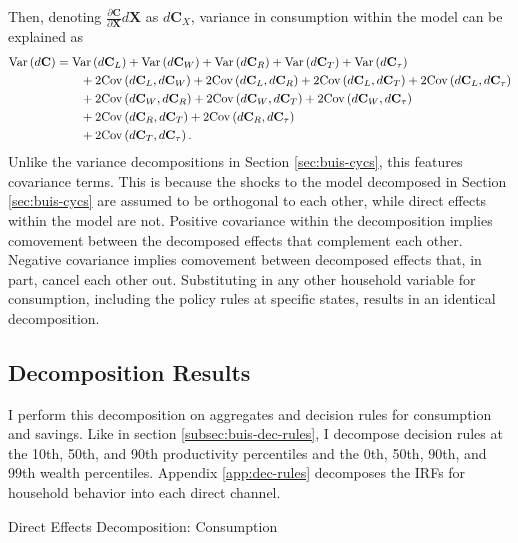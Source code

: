 Then, denoting $\frac{\partial \mathbf{C}}{\partial \mathbf{X}} d \mathbf{X}$ as $d \mathbf{C}_X$, variance in consumption within the model can be explained as
\begin{align*}
    \mathrm{Var}\left(d \mathbf{C}\right) &= \mathrm{Var}\left(d \mathbf{C}_L\right) + \mathrm{Var}\left(d \mathbf{C}_W\right) + \mathrm{Var}\left(d \mathbf{C}_R\right) + \mathrm{Var}\left(d \mathbf{C}_T\right) + \mathrm{Var}\left(d \mathbf{C}_\tau\right) \\
    & \quad\quad + 2 \mathrm{Cov} \left(d \mathbf{C}_L, d \mathbf{C}_W\right) + 2 \mathrm{Cov} \left(d \mathbf{C}_L, d \mathbf{C}_R\right) + 2 \mathrm{Cov} \left(d \mathbf{C}_L, d \mathbf{C}_T\right) + 2 \mathrm{Cov} \left(d \mathbf{C}_L, d \mathbf{C}_\tau\right) \\
    & \quad\quad + 2 \mathrm{Cov} \left(d \mathbf{C}_W, d \mathbf{C}_R\right) + 2 \mathrm{Cov} \left(d \mathbf{C}_W, d \mathbf{C}_T\right) + 2 \mathrm{Cov} \left(d \mathbf{C}_W, d \mathbf{C}_\tau\right) \\
    & \quad\quad + 2 \mathrm{Cov} \left(d \mathbf{C}_R, d \mathbf{C}_T\right) + 2 \mathrm{Cov} \left(d \mathbf{C}_R, d \mathbf{C}_\tau\right) \\
    & \quad\quad + 2 \mathrm{Cov} \left(d \mathbf{C}_T, d \mathbf{C}_\tau\right).
\end{align*}
Unlike the variance decompositions in Section \ref{sec:buis-cycs}, this features covariance terms. This is because the shocks to the model decomposed in Section \ref{sec:buis-cycs} are assumed to be orthogonal to each other, while direct effects within the model are not. Positive covariance within the decomposition implies comovement between the decomposed effects that complement each other. Negative covariance implies comovement between decomposed effects that, in part, cancel each other out. Substituting in any other household variable for consumption, including the policy rules at specific states, results in an identical decomposition. 


\subsection{Decomposition Results}

I perform this decomposition on aggregates and decision rules for consumption and savings. Like in section \ref{subsec:buis-dec-rules}, I decompose decision rules at the 10th, 50th, and 90th productivity percentiles and the 0th, 50th, 90th, and 99th wealth percentiles. Appendix \ref{app:dec-rules} decomposes the IRFs for household behavior into each direct channel.

\begin{table}[t!]  %
    \centering
    \caption{Direct Effects Decomposition: Consumption}
    
    \label{tab:c-dir-decomp}
\end{table}

